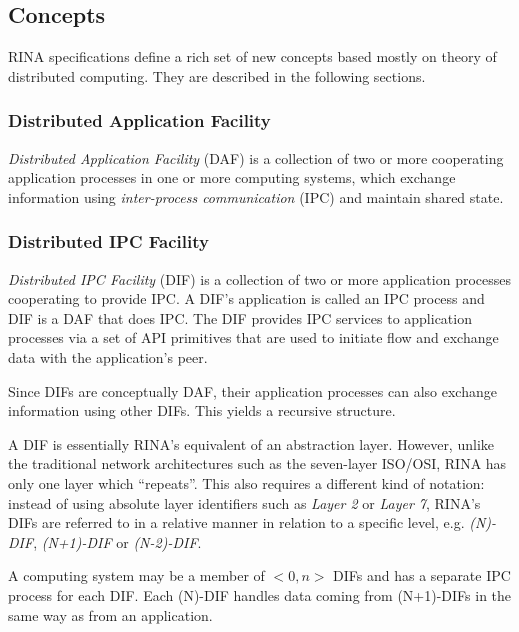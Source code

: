         \subsection{Concepts}

            RINA specifications define a rich set of new concepts based mostly on theory of distributed computing. They are described in the following sections.

            \subsubsection{Distributed Application Facility}

                \emph{Distributed Application Facility} (DAF) is a collection of two or more cooperating application processes in one or more computing systems, which exchange information using \emph{inter-process communication} (IPC) and maintain shared state.

            \subsubsection{Distributed IPC Facility}

                \emph{Distributed IPC Facility} (DIF) is a collection of two or more application processes cooperating to provide IPC. A DIF's application is called an IPC process and DIF is a DAF that does IPC. The DIF provides IPC services to application processes via a set of API primitives that are used to initiate flow and exchange data with the application's peer.

                Since DIFs are conceptually DAF, their application processes can also exchange information using other DIFs. This yields a recursive structure.

                A DIF is essentially RINA's equivalent of an abstraction layer. However, unlike the traditional network architectures such as the seven-layer ISO/OSI, RINA has only one layer which ``repeats''. This also requires a different kind of notation: instead of using absolute layer identifiers such as \emph{Layer 2} or \emph{Layer 7}, RINA's DIFs are referred to in a relative manner in relation to a specific level, e.g. \emph{(N)-DIF}, \emph{(N+1)-DIF} or \emph{(N-2)-DIF}.

                A computing system may be a member of $<0,n>$ DIFs and has a separate IPC process for each DIF. Each (N)-DIF handles data coming from (N+1)-DIFs in the same way as from an application.

